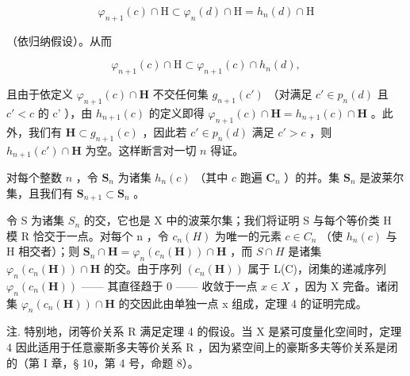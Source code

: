 \[
\varphi_ {n + 1} (c) \cap \mathrm{H} \subset \varphi_ {n} (d) \cap \mathrm{H} = h _ {n} (d) \cap \mathrm{H}
\]

（依归纳假设）。从而

\[
\varphi_ {n + 1} (c) \cap \mathrm{H} \subset \varphi_ {n + 1} (c) \cap h _ {n} (d),
\]

且由于依定义 \(\varphi_{n+1}(c) \cap \mathbf{H}\) 不交任何集 \(g_{n+1}(c')\) （对满足 \(c' \in p_n(d)\) 且 \(c' < c\) 的 c' ），由 \(h_{n+1}(c)\) 的定义即得 \(\varphi_{n+1}(c) \cap \mathbf{H} = h_{n+1}(c) \cap \mathbf{H}\) 。此外，我们有 \(\mathbf{H} \subset g_{n+1}(c)\) ，因此若 \(c' \in p_n(d)\) 满足 \(c' > c\) ，则 \(h_{n+1}(c') \cap \mathbf{H}\) 为空。这样断言对一切 \(n\) 得证。

对每个整数 \(n\) ，令 \(\mathbf{S}_n\) 为诸集 \(h_n(c)\) （其中 \(c\) 跑遍 \(\mathbf{C}_n\) ）的并。集 \(\mathbf{S}_n\) 是波莱尔集，且我们有 \(\mathbf{S}_{n+1} \subset \mathbf{S}_n\) 。

令 S 为诸集 \(S_{n}\) 的交，它也是 X 中的波莱尔集；我们将证明 S 与每个等价类 H 模 R 恰交于一点。对每个 n ，令 \(c_{n}(H)\) 为唯一的元素 \(c \in C_{n}\) （使 \(h_{n}(c)\) 与 H 相交者）；则 \(\mathbf{S}_{n} \cap \mathbf{H} = \varphi_{n}(c_{n}(\mathbf{H})) \cap \mathbf{H}\) ，而 \(S \cap H\) 是诸集 \(\varphi_{n}(c_{n}(\mathbf{H})) \cap \mathbf{H}\) 的交。由于序列 \((c_{n}(\mathbf{H}))\) 属于 L(C)，闭集的递减序列 \(\varphi_{n}(c_{n}(\mathbf{H}))\) —— 其直径趋于 0 —— 收敛于一点 \(x \in X\) ，因为 X 完备。诸闭集 \(\varphi_{n}(c_{n}(\mathbf{H})) \cap \mathbf{H}\) 的交因此由单独一点 x 组成，定理 4 的证明完成。

注. 特别地，闭等价关系 R 满足定理 4 的假设。当 X 是紧可度量化空间时，定理 4 因此适用于任意豪斯多夫等价关系 R ，因为紧空间上的豪斯多夫等价关系是闭的（第 I 章，§ 10，第 4 号，命题 8）。


